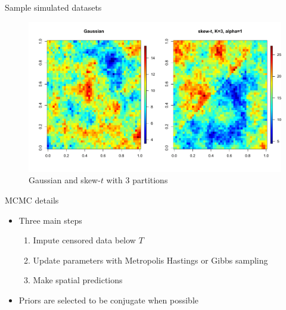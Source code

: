 \documentclass{beamer}
\begin{document}
\begin{frame}{Sample simulated datasets}
  \centering
  \begin{figure}
  \includegraphics[width=1\linewidth, trim=0in 0.5in 0in 0in]{./plots/pot/gauss-vs-skew-t3.pdf}
  \caption{Gaussian and skew-$t$ with 3 partitions}
  \end{figure}
\end{frame}


\begin{frame}{MCMC details}
  \begin{itemize} \setlength{\itemsep}{1em}
    \item Three main steps \vspace{0.5em}
    \begin{enumerate}[1.] \setlength{\itemsep}{0.5em}
      \item Impute censored data below $T$
      \item Update parameters with Metropolis Hastings or Gibbs sampling
      \item Make spatial predictions
    \end{enumerate}
    \item Priors are selected to be conjugate when possible
  \end{itemize}
\end{frame}
\end{document}
